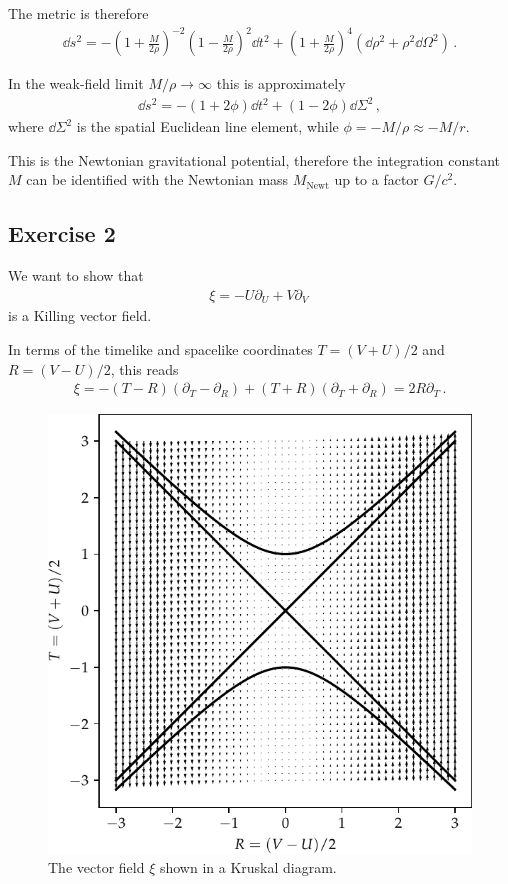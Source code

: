 \documentclass[main.tex]{subfiles}
\begin{document}
The metric is therefore %
\begin{align}
\dd{s^2} = - \left(1 + \frac{M}{2 \rho }\right)^{-2} \left( 1 - \frac{M}{2 \rho }\right)^2 \dd{t^2}
+ \left(1 + \frac{M}{2 \rho }\right)^4 \left( \dd{\rho^2} + \rho^2 \dd{\Omega^2}\right)
\,.
\end{align}
%

In the weak-field limit \(M / \rho \to \infty \) this is approximately %
\begin{align}
\dd{s^2} = - \left(1 + 2 \phi \right) \dd{t^2} + (1 - 2 \phi ) \dd{\Sigma^2}
\,,
\end{align}
%
where \(\dd{\Sigma^2}\) is the spatial Euclidean line element, while \(\phi = - M / \rho \approx - M / r\). 

This is the Newtonian gravitational potential, therefore the integration constant \(M\) can be identified with the Newtonian mass \(M _{\text{Newt}}\) up to a factor \(G / c^2 \).

\subsection{Exercise 2}

We want to show that %
\begin{align}
\xi = - U \partial_U + V \partial_V
\,
\end{align}
%
is a Killing vector field.

In terms of the timelike and spacelike coordinates \(T = (V + U) / 2\) and \(R = (V - U) / 2\), this reads %
\begin{align}
\xi = - (T-R) (\partial_T - \partial_R) + ( T + R) (\partial_T + \partial_R) = 2 R \partial_T
\,.
\end{align}

\begin{figure}[ht]
\centering
\includegraphics[width=.8\textwidth]{figures/killing_kruskal}
\caption{The vector field \(\xi \) shown in a Kruskal diagram.}
\label{fig:killing_kruskal}
\end{figure}
\end{document}

